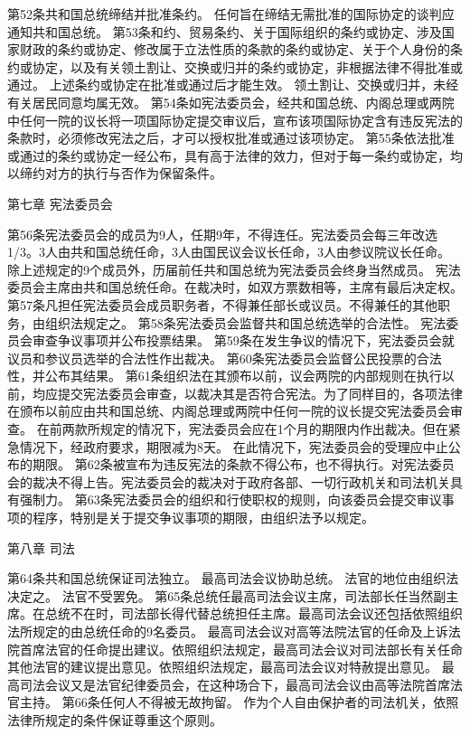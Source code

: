     第52条共和国总统缔结并批准条约。
    任何旨在缔结无需批准的国际协定的谈判应通知共和国总统。
    第53条和约、贸易条约、关于国际组织的条约或协定、涉及国家财政的条约或协定、修改属于立法性质的条款的条约或协定、关于个人身份的条约或协定，以及有关领土割让、交换或归并的条约或协定，非根据法律不得批准或通过。
    上述条约或协定在批准或通过后才能生效。
    领土割让、交换或归并，未经有关居民同意均属无效。
    第54条如宪法委员会，经共和国总统、内阁总理或两院中任何一院的议长将一项国际协定提交审议后，宣布该项国际协定含有违反宪法的条款时，必须修改宪法之后，才可以授权批准或通过该项协定。
    第55条依法批准或通过的条约或协定一经公布，具有高于法律的效力，但对于每一条约或协定，均以缔约对方的执行与否作为保留条件。
                      
                          第七章    宪法委员会
 
    第56条宪法委员会的成员为9人，任期9年，不得连任。宪法委员会每三年改选1/3。3人由共和国总统任命，3人由国民议会议长任命，3人由参议院议长任命。
    除上述规定的9个成员外，历届前任共和国总统为宪法委员会终身当然成员。
    宪法委员会主席由共和国总统任命。在裁决时，如双方票数相等，主席有最后决定权。
    第57条凡担任宪法委员会成员职务者，不得兼任部长或议员。不得兼任的其他职务，由组织法规定之。
    第58条宪法委员会监督共和国总统选举的合法性。
    宪法委员会审查争议事项并公布投票结果。
    第59条在发生争议的情况下，宪法委员会就议员和参议员选举的合法性作出裁决。
第60条宪法委员会监督公民投票的合法性，并公布其结果。
    第61条组织法在其颁布以前，议会两院的内部规则在执行以前，均应提交宪法委员会审查，以裁决其是否符合宪法。为了同样目的，各项法律在颁布以前应由共和国总统、内阁总理或两院中任何一院的议长提交宪法委员会审查。
    在前两款所规定的情况下，宪法委员会应在1个月的期限内作出裁决。但在紧急情况下，经政府要求，期限减为8天。
    在此情况下，宪法委员会的受理应中止公布的期限。
    第62条被宣布为违反宪法的条款不得公布，也不得执行。对宪法委员会的裁决不得上告。宪法委员会的裁决对于政府各部、一切行政机关和司法机关具有强制力。
    第63条宪法委员会的组织和行使职权的规则，向该委员会提交审议事项的程序，特别是关于提交争议事项的期限，由组织法予以规定。
                           
                            第八章    司法
 
    第64条共和国总统保证司法独立。
    最高司法会议协助总统。
    法官的地位由组织法决定之。
    法官不受罢免。
    第65条总统任最高司法会议主席，司法部长任当然副主席。在总统不在时，司法部长得代替总统担任主席。最高司法会议还包括依照组织法所规定的由总统任命的9名委员。
    最高司法会议对高等法院法官的任命及上诉法院首席法官的任命提出建议。依照组织法规定，最高司法会议对司法部长有关任命其他法官的建议提出意见。依照组织法规定，最高司法会议对特赦提出意见。
    最高司法会议又是法官纪律委员会，在这种场合下，最高司法会议由高等法院首席法官主持。
    第66条任何人不得被无故拘留。
    作为个人自由保护者的司法机关，依照法律所规定的条件保证尊重这个原则。
 
